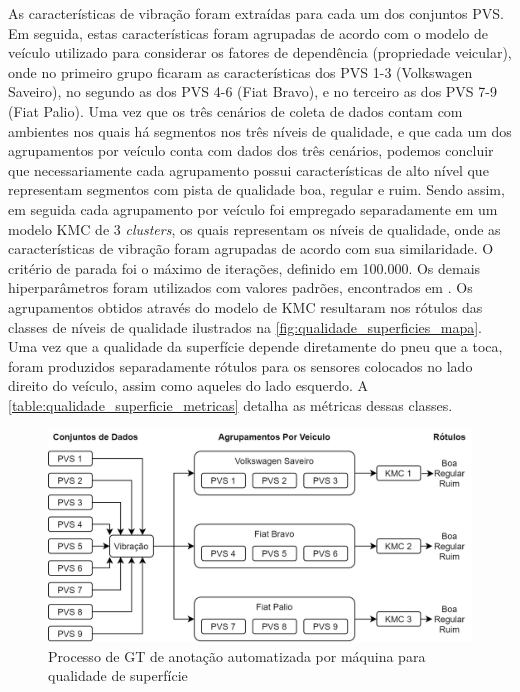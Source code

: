 As características de vibração foram extraídas para cada um dos conjuntos PVS. Em seguida, estas características foram agrupadas de acordo com o modelo de veículo utilizado para considerar os fatores de dependência (propriedade veicular), onde no primeiro grupo ficaram as características dos PVS 1-3 (Volkswagen Saveiro), no segundo as dos PVS 4-6 (Fiat Bravo), e no terceiro as dos PVS 7-9 (Fiat Palio). Uma vez que os três cenários de coleta de dados contam com ambientes nos quais há segmentos nos três níveis de qualidade, e que cada um dos agrupamentos por veículo conta com dados dos três cenários, podemos concluir que necessariamente cada agrupamento possui características de alto nível que representam segmentos com pista de qualidade boa, regular e ruim. Sendo assim, em seguida cada agrupamento por veículo foi empregado separadamente em um modelo KMC de 3 \textit{clusters}, os quais representam os níveis de qualidade, onde as características de vibração foram agrupadas de acordo com sua similaridade. O critério de parada foi o máximo de iterações, definido em 100.000. Os demais hiperparâmetros foram utilizados com valores padrões, encontrados em .  Os agrupamentos obtidos através do modelo de KMC resultaram nos rótulos das classes de níveis de qualidade ilustrados na \autoref{fig:qualidade_superficies_mapa}. Uma vez que a qualidade da superfície depende diretamente do pneu que a toca, foram produzidos separadamente rótulos para os sensores colocados no lado direito do veículo, assim como aqueles do lado esquerdo. A \autoref{table:qualidade_superficie_metricas} detalha as métricas dessas classes.  
\begin{figure}[h]
  \centering
  \caption{Processo de GT de anotação automatizada por máquina para qualidade de superfície}
   \label{fig:processo_anotacao}
   \includegraphics[width=1\textwidth]{figuras/fig_26_1.png}
\end{figure}
 
